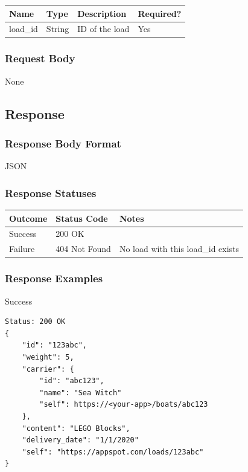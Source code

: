 \documentclass[letterpaper,11pt,titlepage,draftclsnofoot,onecolumn,compsoc,utf8,latin1]{IEEEtran}
\begin{document}
\begin{singlespace}
\begin{center}
    \begin{tabular}{ | p{} | p{} | p{} | p{} |}
    \hline
        \textbf{Name} & \textbf{Type} & \textbf{Description} &\textbf{Required?}  \\ \hline
        load\_id & String & ID of the load & Yes \\
    \hline
    \end{tabular}
\end{center}

\subsubsection{Request Body}

None

\subsection{Response}
\subsubsection{Response Body Format}

JSON

\subsubsection{Response Statuses}

\begin{center}
\begin{tabular}{ |p{}|p{}|p{}| } 
 \hline
 \textbf{Outcome} & \textbf{Status Code} & \textbf{Notes}  \\  \hline
 Success & 200 OK &  \\ \hline
 Failure & 404 Not Found & No load with this load\_id exists \\
 \hline
\end{tabular}
\end{center}

\subsubsection{Response Examples}

\noindent \Large{Success}

\begin{lstlisting}[]
Status: 200 OK
{ 
    "id": "123abc",
    "weight": 5,
    "carrier": {
        "id": "abc123",
        "name": "Sea Witch"
        "self": https://<your-app>/boats/abc123
    },
    "content": "LEGO Blocks",
    "delivery_date": "1/1/2020"
    "self": "https://appspot.com/loads/123abc"
}
\end{lstlisting}


\end{singlespace}
\end{document}
